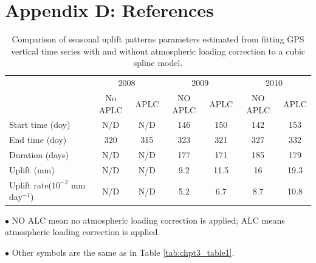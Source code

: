 \newpage





\clearpage
\section*{Appendix D: References}



\clearpage
\begin{table}[h!]
	\centering
	\caption{Comparison of seasonal uplift patterns parameters estimated from fitting GPS vertical time series with and without atmospheric loading correction to a cubic spline model.}
	\begin{adjustbox}{width=1\textwidth}
	\begin{threeparttable}
		\begin{tabular}{lcccccc}
			\midrule
			&\multicolumn{2}{c}{2008} & \multicolumn{2}{c}{2009} & \multicolumn{2}{c}{2010} \\
			& No APLC & APLC & NO APLC & APLC & NO APLC & APLC \\
			\midrule
			Start time (doy) & N/D & N/D & 146 & 150 & 142 & 153\\
			End time (doy) & 320 & 315 & 323 & 321 & 327 & 332\\
			Duration (days) & N/D & N/D & 177 & 171 & 185 & 179\\
			Uplift (mm) & N/D & N/D & 9.2 & 11.5 & 16 & 19.3\\
			Uplift rate($10^{-2}$ mm day$^{-1}$) & N/D & N/D & 5.2 & 6.7 & 8.7 & 10.8\\
			\midrule
		\end{tabular}
		\begin{tablenotes}
			\small
			\item $\bullet$ NO ALC mean no atmospheric loading correction is applied; ALC means atmospheric loading correction is applied. 
			\item $\bullet$ Other symbols are the same as in Table \ref{tab:chpt3_table1}.
		\end{tablenotes}
		\end{threeparttable}
	\end{adjustbox}
	\label{tab:SI_chpt3_table1}
\end{table}

